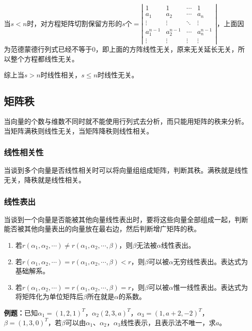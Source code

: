 \documentclass[UTF8, 12pt]{ctexart}
\begin{document}
当$s<n$时，对方程矩阵切割保留方形的$s$个$=\left|\begin{array}{cccc}
    1 & 1 & \cdots & 1 \\
    a_1 & a_2 & \cdots & a_n \\
    \vdots & \vdots & \ddots & \vdots \\
    a_1^{n-1} & a_2^{n-1} & \cdots & a_n^{n-1} \\
    \vdots & \vdots & \vdots & \vdots
\end{array}\right|$，上面因为范德蒙德行列式已经不等于0，即上面的方阵线性无关，原来无关延长无关，所以整个方程都线性无关。

综上当$s>n$时线性相关，$s\leqslant n$时线性无关。

\subsection{矩阵秩}

当向量的个数与维数不同时就不能使用行列式去分析，而只能用矩阵的秩来分析。当矩阵满秩则线性无关，当矩阵降秩则线性相关。

\subsubsection{线性相关性}

当谈到多个向量是否线性相关时可以将向量组组成矩阵，判断其秩。满秩就是线性无关，降秩就是线性相关。

\subsubsection{线性表出}

当谈到一个向量是否能被其他向量线性表出时，要将这些向量全部组成一起，判断能否被其他向量表出的向量放在最右边，然后判断增广矩阵的秩。

\begin{enumerate}
    \item 若$r(\alpha_1,\alpha_2,\cdots)\neq r(\alpha_1,\alpha_2,\cdots,\beta)$，则$\beta$无法被$\alpha$线性表出。
    \item 若$r(\alpha_1,\alpha_2,\cdots)=r(\alpha_1,\alpha_2,\cdots,\beta)<r$，则$\beta$可以被$\alpha$无穷线性表出。表达式为基础解系。
    \item 若$r(\alpha_1,\alpha_2,\cdots)=r(\alpha_1,\alpha_2,\cdots,\beta)=r$，则$\beta$可以被$\alpha$惟一线性表出。表达式为将矩阵化为单位矩阵后$\beta$所在就是$\alpha$的系数。
\end{enumerate}

\textbf{例题：}已知$\alpha_1=(1,2,1)^T$，$\alpha_2(2,3,a)^T$，$\alpha_3=(1,a+2,-2)^T$，$\beta=(1,3,0)^T$，若$\beta$可以由$\alpha_1$、$\alpha_2$，$\alpha_3$线性表示，且表示法不唯一，求$a$。
\end{document}
